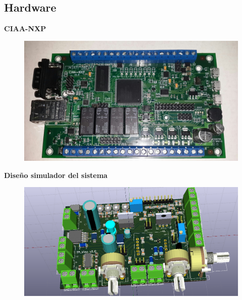\documentclass[11pt]{beamer}
\begin{document}
\subsection{Hardware}
\begin{frame}{\textbf{\LARGE{CIAA-NXP}}}
  \vspace{-.7cm}
  \begin{figure}[H]
    {\includegraphics[width=1\textwidth]{./imagenes/ciaa.png}}
  \end{figure}	
\end{frame}

\begin{frame}{\textbf{\LARGE{Diseño simulador del sistema}}}
  \vspace{-.7cm}
  \begin{figure}[H]
    {\includegraphics[width=1\textwidth]{./imagenes/pcb_3d.png}}
  \end{figure}	
\end{frame}
\end{document}
